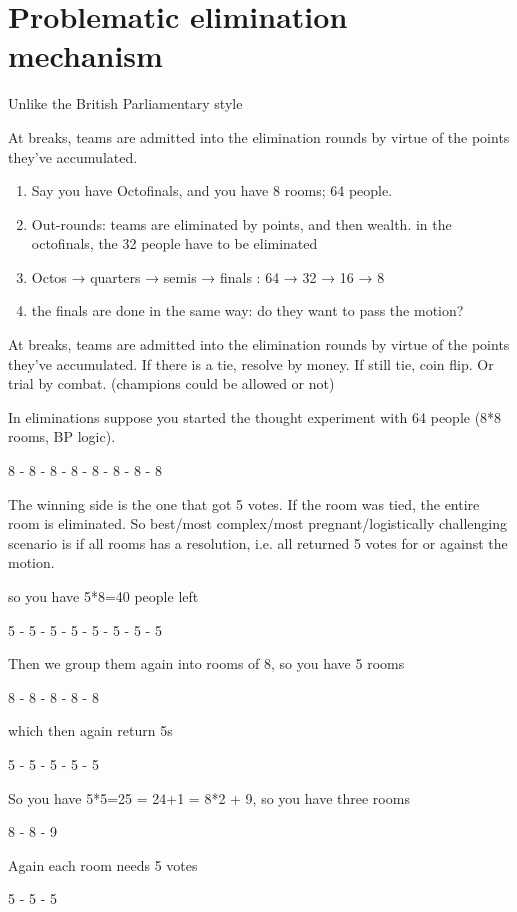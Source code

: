 


\section{Problematic elimination mechanism}

Unlike the British Parliamentary style


At breaks, teams are admitted into the elimination rounds by virtue of the points they've accumulated.

\begin{enumerate}
    \item Say you have Octofinals, and you have 8 rooms; 64 people.
    \item Out-rounds: teams are eliminated by points, and then wealth. in the octofinals, the 32 people have to be eliminated
    \item Octos → quarters → semis → finals : 64 → 32 → 16 → 8
    \item the finals are done in the same way: do they want to pass the motion?
\end{enumerate}

At breaks, teams are admitted into the elimination rounds by virtue of the points they've accumulated. If there is a tie, resolve by money. If still tie, coin flip. Or trial by combat. (champions could be allowed or not)

In eliminations suppose you started the thought experiment with 64 people (8*8 rooms, BP logic).

8 - 8 - 8 - 8 - 8 - 8 - 8 - 8

The winning side is the one that got 5 votes. If the room was tied, the entire room is eliminated. So best/most complex/most pregnant/logistically challenging scenario is if all rooms has a resolution, i.e. all returned 5 votes for or against the motion.

so you have 5*8=40 people left

5 - 5 - 5 - 5 - 5 - 5 - 5 - 5

Then we group them again into rooms of 8, so you have 5 rooms

8 - 8 - 8 - 8 - 8

which then again return 5s

5 - 5 - 5 - 5 - 5

So you have 5*5=25 = 24+1 = 8*2 + 9, so you have three rooms

8 - 8 - 9

Again each room needs 5 votes

5 - 5 - 5

